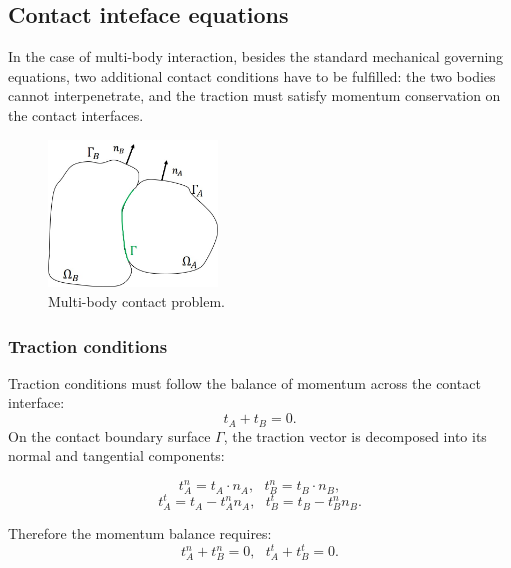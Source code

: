 \subsection{Contact inteface equations}%
 In the case of multi-body interaction, besides the standard mechanical governing equations, two additional contact conditions have to be fulfilled: the two bodies cannot interpenetrate, and the traction must satisfy momentum conservation on the contact interfaces.
   

\begin{figure}[h]
\centering
\centerline{\includegraphics[width=0.4\textwidth,keepaspectratio]{figures/contact_bodies.jpg} }
\caption{Multi-body contact problem.}
\label{contact_bodies}
\end{figure}

   
  \subsubsection*{Traction conditions}
  Traction conditions must follow the balance of momentum across the contact interface:
  \begin{equation}
  t_A + t_B=0.
\end{equation}
On the contact boundary surface $\Gamma$, the traction vector is decomposed into its normal and tangential components:

\begin{equation}
t_A^n = t_A \cdot n_A,  \ \ \ t_B^n = t_B \cdot n_B,
\end{equation} 
\begin{equation}
t_A^t = t_A - t_A^n n_A, \ \ \ t_B^t = t_B - t_B^n n_B.
\end{equation}

Therefore the momentum balance requires:
\begin{equation} 
t_A^n + t_B^n = 0, \ \ \ t_A^t + t_B^t = 0.
\end{equation} 

